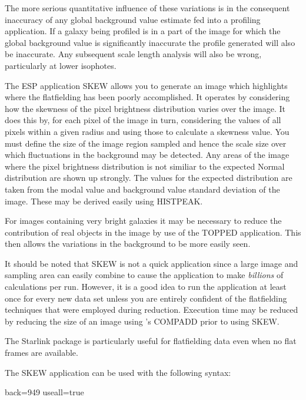 \documentclass[twoside,11pt]{starlink}
\begin{document}
The more serious quantitative influence of these variations is in
the consequent inaccuracy of any global background value estimate fed into a
profiling application. If a galaxy being profiled is in a part of the image for
which the global background value is significantly inaccurate the profile
generated will also be inaccurate. Any subsequent scale length analysis
will also be wrong, particularly at lower isophotes.

The ESP application SKEW allows you to generate an image which highlights
where the flatfielding has been poorly accomplished.
It operates by considering how the skewness of the pixel brightness distribution
varies over the image. It does this by, for each pixel of the image in turn,
considering the values of all pixels within a given radius and using those to
calculate a skewness value. You must define the size of the image region
sampled and hence the scale size over which fluctuations in the background
may be detected. Any areas of the image where the pixel brightness distribution
is not similiar to the expected Normal distribution are shown up strongly.
The values for the expected distribution are taken from the modal value
and background value standard deviation of the image. These may be derived easily
using HISTPEAK.

For images containing very bright galaxies it may be necessary to reduce the
contribution of real objects in the image by use of the TOPPED application.
This then allows the variations in the background to be
more easily seen.

It should be noted that SKEW is not a quick application since a large image and
sampling area can easily combine to cause the application to make \emph{billions}
of calculations per run. However, it is a good idea to run the application at
least once for every new data set unless you are entirely confident of the
flatfielding techniques that were employed during reduction. Execution time
may be reduced by reducing the size of an image using 's COMPADD prior
to using SKEW.

The Starlink package  is particularly useful for flatfielding data
even when no flat frames are available.

The SKEW application can be used with the following syntax:

\begin{terminalv}
             back=949 useall=true
\end{terminalv}
\end{document}
